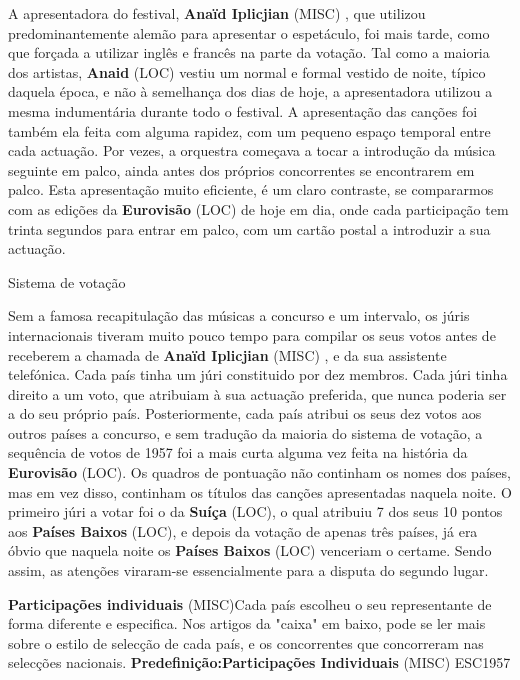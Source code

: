 \documentclass[12pt,a4paper]{article}
\begin{document}
A apresentadora do festival, \textbf{Anaïd Iplicjian} (MISC) , que utilizou predominantemente alemão para apresentar o espetáculo, foi mais tarde, como que forçada a utilizar inglês e francês na parte da votação. Tal como a maioria dos artistas, \textbf{Anaid} (LOC) vestiu um normal e formal vestido de noite, típico daquela época, e não à semelhança dos dias de hoje, a apresentadora utilizou a mesma indumentária durante todo o festival. A apresentação das canções foi também ela feita com alguma rapidez, com um pequeno espaço temporal entre cada actuação. Por vezes, a orquestra começava a tocar a introdução da música seguinte em palco, ainda antes dos próprios concorrentes se encontrarem em palco. Esta apresentação muito eficiente, é um claro contraste, se compararmos com as edições da \textbf{Eurovisão} (LOC) de hoje em dia, onde cada participação tem trinta segundos para entrar em palco, com um cartão postal a introduzir a sua actuação.



Sistema de votação

Sem a famosa recapitulação das músicas a concurso e um intervalo, os júris internacionais tiveram muito pouco tempo para compilar os seus votos antes de receberem a chamada de \textbf{Anaïd Iplicjian} (MISC) , e da sua assistente telefónica. Cada país tinha um júri constituido por dez membros. Cada júri tinha direito a um voto, que atribuiam à sua actuação preferida, que nunca poderia ser a do seu próprio país. Posteriormente, cada país atribui os seus dez votos aos outros países a concurso, e sem tradução da maioria do sistema de votação, a sequência de votos de 1957 foi a mais curta alguma vez feita na história da \textbf{Eurovisão} (LOC). Os quadros de pontuação não continham os nomes dos países, mas em vez disso, continham os títulos das canções apresentadas naquela noite. O primeiro júri a votar foi o da \textbf{Suíça} (LOC), o qual atribuiu 7 dos seus 10 pontos aos \textbf{Países Baixos} (LOC), e depois da votação de apenas três países, já era óbvio que naquela noite os \textbf{Países Baixos} (LOC) venceriam o certame. Sendo assim, as atenções viraram-se essencialmente para a disputa do segundo lugar.



\textbf{Participações individuais} (MISC)Cada país escolheu o seu representante de forma diferente e especifica. Nos artigos da "caixa" em baixo, pode se ler mais sobre o estilo de selecção de cada país, e os concorrentes que concorreram nas selecções nacionais. \textbf{Predefinição:Participações Individuais} (MISC) ESC1957
\end{document}
